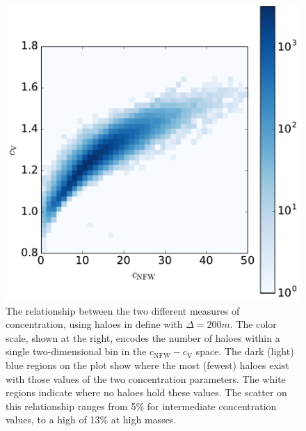 \documentclass[usenatbib,fleqn]{mnras}
\begin{document}
\begin{figure}
\centering
\includegraphics[width=\columnwidth]{cvvscnfw_relation.pdf}
\caption{
The relationship between the two different measures of concentration, using haloes in \simB define with $\Delta=200m$. The color scale, shown at the right, encodes the number of haloes within a single two-dimensional bin in the $c_{\mathrm{NFW}}-c_{\mathrm{V}}$ space. The dark (light) blue regions on the plot show where the most (fewest) haloes exist with those values of the two concentration parameters. The white regions indicate where no haloes hold these values. The scatter on this relationship ranges from 5\% for intermediate concentration values, to a high of 13\% at high masses.   }
\label{fig:concentrations}
\end{figure}
\end{document}
